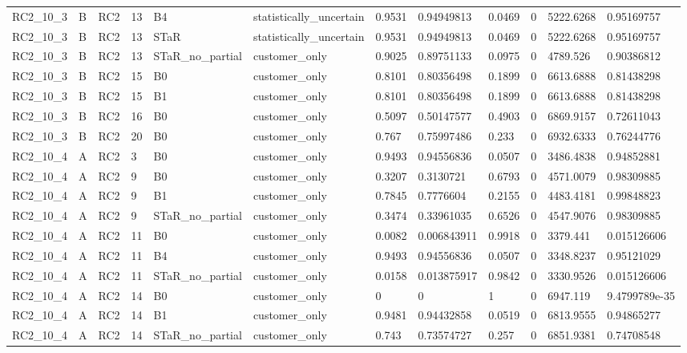 \begin{longtable}{llllllllllll}
RC2\_10\_3 & B & RC2 & 13 & B4 & statistically\_uncertain & 0.9531 & 0.94949813 & 0.0469 & 0 & 5222.6268 & 0.95169757 \\
RC2\_10\_3 & B & RC2 & 13 & STaR & statistically\_uncertain & 0.9531 & 0.94949813 & 0.0469 & 0 & 5222.6268 & 0.95169757 \\
RC2\_10\_3 & B & RC2 & 13 & STaR\_no\_partial & customer\_only & 0.9025 & 0.89751133 & 0.0975 & 0 & 4789.526 & 0.90386812 \\
RC2\_10\_3 & B & RC2 & 15 & B0 & customer\_only & 0.8101 & 0.80356498 & 0.1899 & 0 & 6613.6888 & 0.81438298 \\
RC2\_10\_3 & B & RC2 & 15 & B1 & customer\_only & 0.8101 & 0.80356498 & 0.1899 & 0 & 6613.6888 & 0.81438298 \\
RC2\_10\_3 & B & RC2 & 16 & B0 & customer\_only & 0.5097 & 0.50147577 & 0.4903 & 0 & 6869.9157 & 0.72611043 \\
RC2\_10\_3 & B & RC2 & 20 & B0 & customer\_only & 0.767 & 0.75997486 & 0.233 & 0 & 6932.6333 & 0.76244776 \\
RC2\_10\_4 & A & RC2 & 3 & B0 & customer\_only & 0.9493 & 0.94556836 & 0.0507 & 0 & 3486.4838 & 0.94852881 \\
RC2\_10\_4 & A & RC2 & 9 & B0 & customer\_only & 0.3207 & 0.3130721 & 0.6793 & 0 & 4571.0079 & 0.98309885 \\
RC2\_10\_4 & A & RC2 & 9 & B1 & customer\_only & 0.7845 & 0.7776604 & 0.2155 & 0 & 4483.4181 & 0.99848823 \\
RC2\_10\_4 & A & RC2 & 9 & STaR\_no\_partial & customer\_only & 0.3474 & 0.33961035 & 0.6526 & 0 & 4547.9076 & 0.98309885 \\
RC2\_10\_4 & A & RC2 & 11 & B0 & customer\_only & 0.0082 & 0.006843911 & 0.9918 & 0 & 3379.441 & 0.015126606 \\
RC2\_10\_4 & A & RC2 & 11 & B4 & customer\_only & 0.9493 & 0.94556836 & 0.0507 & 0 & 3348.8237 & 0.95121029 \\
RC2\_10\_4 & A & RC2 & 11 & STaR\_no\_partial & customer\_only & 0.0158 & 0.013875917 & 0.9842 & 0 & 3330.9526 & 0.015126606 \\
RC2\_10\_4 & A & RC2 & 14 & B0 & customer\_only & 0 & 0 & 1 & 0 & 6947.119 & 9.4799789e-35 \\
RC2\_10\_4 & A & RC2 & 14 & B1 & customer\_only & 0.9481 & 0.94432858 & 0.0519 & 0 & 6813.9555 & 0.94865277 \\
RC2\_10\_4 & A & RC2 & 14 & STaR\_no\_partial & customer\_only & 0.743 & 0.73574727 & 0.257 & 0 & 6851.9381 & 0.74708548 \\

\end{longtable}
